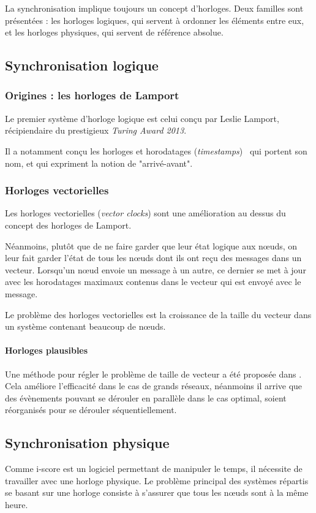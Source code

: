 La synchronisation implique toujours un concept d'horloges. Deux familles sont présentées : les horloges logiques, qui servent à ordonner les éléments entre eux, et les horloges physiques, qui servent de référence absolue.

\subsection{Synchronisation logique}
\subsubsection{Origines : les horloges de Lamport}
Le premier système d'horloge logique est celui conçu par Leslie Lamport, récipiendaire du prestigieux \textit{Turing Award 2013}.

Il a notamment conçu les horloges et horodatages (\textit{timestamps})~\cite{lamport1978time} qui portent son nom, et qui expriment la notion de "arrivé-avant".
\subsubsection{Horloges vectorielles}
Les horloges vectorielles (\textit{vector clocks}) sont une amélioration au dessus du concept des horloges de Lamport.

Néanmoins, plutôt que de ne faire garder que leur état logique aux nœuds, on leur fait garder l'état de tous les nœuds dont ils ont reçu des messages dans un vecteur\cite{fidge1988timestamps}. Lorsqu'un nœud envoie un message à un autre, ce dernier se met à jour avec les horodatages maximaux contenus dans le vecteur qui est envoyé avec le message.

Le problème des horloges vectorielles est la croissance de la taille du vecteur dans un système contenant beaucoup de nœuds.

\paragraph{Horloges plausibles}
Une méthode pour régler le problème de taille de vecteur a été proposée dans \cite{torres1999plausible}. Cela améliore l'efficacité dans le cas de grands réseaux, néanmoins il arrive que des évènements pouvant se dérouler en parallèle dans le cas optimal, soient réorganisés pour se dérouler séquentiellement.

\subsection{Synchronisation physique}
Comme i-score est un logiciel permettant de manipuler le temps, il nécessite de travailler avec une horloge physique. Le problème principal des systèmes répartis se basant sur une horloge consiste à s'assurer que tous les nœuds sont à la même heure.

